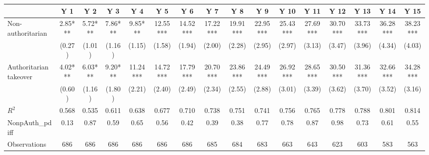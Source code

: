 {
\def\sym#1{\ifmmode^{#1}\else\(^{#1}\)\fi}
\begin{tabular}{l*{15}{c}}
\hline\hline
                &\multicolumn{1}{c}{Y 1}&\multicolumn{1}{c}{Y 2}&\multicolumn{1}{c}{Y 3}&\multicolumn{1}{c}{Y 4}&\multicolumn{1}{c}{Y 5}&\multicolumn{1}{c}{Y 6}&\multicolumn{1}{c}{Y 7}&\multicolumn{1}{c}{Y 8}&\multicolumn{1}{c}{Y 9}&\multicolumn{1}{c}{Y 10}&\multicolumn{1}{c}{Y 11}&\multicolumn{1}{c}{Y 12}&\multicolumn{1}{c}{Y 13}&\multicolumn{1}{c}{Y 14}&\multicolumn{1}{c}{Y 15}\\
\hline
Non-authoritarian&     2.85***&     5.72***&     7.86***&     9.85***&    12.55***&    14.52***&    17.22***&    19.91***&    22.95***&    25.43***&    27.69***&    30.70***&    33.73***&    36.28***&    38.23***\\
                &   (0.27)   &   (1.01)   &   (1.16)   &   (1.15)   &   (1.58)   &   (1.94)   &   (2.00)   &   (2.28)   &   (2.95)   &   (2.97)   &   (3.13)   &   (3.47)   &   (3.96)   &   (4.34)   &   (4.03)   \\
[1em]
Authoritarian takeover&     4.02***&     6.03***&     9.20***&    11.24***&    14.72***&    17.79***&    20.70***&    23.86***&    24.49***&    26.92***&    28.65***&    30.50***&    31.36***&    32.66***&    34.28***\\
                &   (0.60)   &   (1.16)   &   (1.80)   &   (2.21)   &   (2.40)   &   (2.49)   &   (2.34)   &   (2.55)   &   (2.88)   &   (3.01)   &   (3.39)   &   (3.62)   &   (3.70)   &   (3.52)   &   (3.16)   \\
\hline
\(R^{2}\)       &    0.568   &    0.535   &    0.611   &    0.638   &    0.677   &    0.710   &    0.738   &    0.751   &    0.741   &    0.756   &    0.765   &    0.778   &    0.788   &    0.801   &    0.814   \\
NonpAuth\_pdiff  &     0.13   &     0.87   &     0.59   &     0.65   &     0.56   &     0.42   &     0.39   &     0.38   &     0.77   &     0.78   &     0.87   &     0.98   &     0.73   &     0.61   &     0.55   \\
Observations    &      686   &      686   &      686   &      686   &      686   &      686   &      685   &      684   &      683   &      663   &      643   &      623   &      603   &      583   &      563   \\
\hline\hline
\end{tabular}
}
